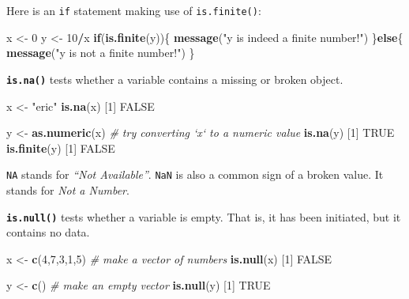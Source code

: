 \documentclass[
]{book}
\newenvironment{Shaded}{\begin{snugshade}}{\end{snugshade}}
\newcommand{\CommentTok}[1]{\textcolor[rgb]{0.56,0.35,0.01}{\textit{#1}}}
\newcommand{\ControlFlowTok}[1]{\textcolor[rgb]{0.13,0.29,0.53}{\textbf{#1}}}
\newcommand{\DecValTok}[1]{\textcolor[rgb]{0.00,0.00,0.81}{#1}}
\newcommand{\KeywordTok}[1]{\textcolor[rgb]{0.13,0.29,0.53}{\textbf{#1}}}
\newcommand{\NormalTok}[1]{#1}
\newcommand{\OperatorTok}[1]{\textcolor[rgb]{0.81,0.36,0.00}{\textbf{#1}}}
\newcommand{\OtherTok}[1]{\textcolor[rgb]{0.56,0.35,0.01}{#1}}
\newcommand{\StringTok}[1]{\textcolor[rgb]{0.31,0.60,0.02}{#1}}
\begin{document}
Here is an \texttt{if} statement making use of \texttt{is.finite()}:

\begin{Shaded}
\begin{Highlighting}[]
\NormalTok{x <-}\StringTok{ }\DecValTok{0}
\NormalTok{y <-}\StringTok{ }\DecValTok{10}\OperatorTok{/}\NormalTok{x}
\ControlFlowTok{if}\NormalTok{(}\KeywordTok{is.finite}\NormalTok{(y))\{}
  \KeywordTok{message}\NormalTok{(}\StringTok{"y is indeed a finite number!"}\NormalTok{)}
\NormalTok{\}}\ControlFlowTok{else}\NormalTok{\{}
  \KeywordTok{message}\NormalTok{(}\StringTok{"y is not a finite number!"}\NormalTok{)}
\NormalTok{\}}
\end{Highlighting}
\end{Shaded}

\textbf{\texttt{is.na()}} tests whether a variable contains a missing or broken object.

\begin{Shaded}
\begin{Highlighting}[]
\NormalTok{x <-}\StringTok{ "eric"}
\KeywordTok{is.na}\NormalTok{(x)}
\NormalTok{[}\DecValTok{1}\NormalTok{] }\OtherTok{FALSE}

\NormalTok{y <-}\StringTok{ }\KeywordTok{as.numeric}\NormalTok{(x) }\CommentTok{# try converting `x` to a numeric value}
\KeywordTok{is.na}\NormalTok{(y)}
\NormalTok{[}\DecValTok{1}\NormalTok{] }\OtherTok{TRUE}
\KeywordTok{is.finite}\NormalTok{(y)}
\NormalTok{[}\DecValTok{1}\NormalTok{] }\OtherTok{FALSE}
\end{Highlighting}
\end{Shaded}

\texttt{NA} stands for \emph{``Not Available''}. \texttt{NaN} is also a common sign of a broken value. It stands for \emph{Not a Number}.

\textbf{\texttt{is.null()}} tests whether a variable is empty. That is, it has been initiated, but it contains no data.

\begin{Shaded}
\begin{Highlighting}[]
\NormalTok{x <-}\StringTok{ }\KeywordTok{c}\NormalTok{(}\DecValTok{4}\NormalTok{,}\DecValTok{7}\NormalTok{,}\DecValTok{3}\NormalTok{,}\DecValTok{1}\NormalTok{,}\DecValTok{5}\NormalTok{) }\CommentTok{# make a vector of numbers}
\KeywordTok{is.null}\NormalTok{(x)}
\NormalTok{[}\DecValTok{1}\NormalTok{] }\OtherTok{FALSE}

\NormalTok{y <-}\StringTok{ }\KeywordTok{c}\NormalTok{() }\CommentTok{# make an empty vector}
\KeywordTok{is.null}\NormalTok{(y)}
\NormalTok{[}\DecValTok{1}\NormalTok{] }\OtherTok{TRUE}
\end{Highlighting}
\end{Shaded}
\end{document}
